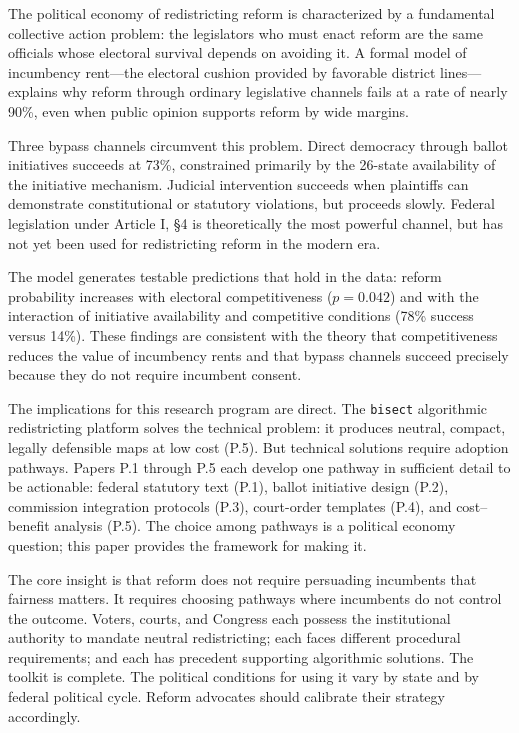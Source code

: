 The political economy of redistricting reform is characterized by a fundamental collective action problem: the legislators who must enact reform are the same officials whose electoral survival depends on avoiding it. A formal model of incumbency rent---the electoral cushion provided by favorable district lines---explains why reform through ordinary legislative channels fails at a rate of nearly 90\%, even when public opinion supports reform by wide margins.

Three bypass channels circumvent this problem. Direct democracy through ballot initiatives succeeds at 73\%, constrained primarily by the 26-state availability of the initiative mechanism. Judicial intervention succeeds when plaintiffs can demonstrate constitutional or statutory violations, but proceeds slowly. Federal legislation under Article I, \S4 is theoretically the most powerful channel, but has not yet been used for redistricting reform in the modern era.

The model generates testable predictions that hold in the data: reform probability increases with electoral competitiveness ($p = 0.042$) and with the interaction of initiative availability and competitive conditions (78\% success versus 14\%). These findings are consistent with the theory that competitiveness reduces the value of incumbency rents and that bypass channels succeed precisely because they do not require incumbent consent.

The implications for this research program are direct. The \texttt{bisect} algorithmic redistricting platform solves the technical problem: it produces neutral, compact, legally defensible maps at low cost (P.5). But technical solutions require adoption pathways. Papers P.1 through P.5 each develop one pathway in sufficient detail to be actionable: federal statutory text (P.1), ballot initiative design (P.2), commission integration protocols (P.3), court-order templates (P.4), and cost--benefit analysis (P.5). The choice among pathways is a political economy question; this paper provides the framework for making it.

The core insight is that reform does not require persuading incumbents that fairness matters. It requires choosing pathways where incumbents do not control the outcome. Voters, courts, and Congress each possess the institutional authority to mandate neutral redistricting; each faces different procedural requirements; and each has precedent supporting algorithmic solutions. The toolkit is complete. The political conditions for using it vary by state and by federal political cycle. Reform advocates should calibrate their strategy accordingly.
